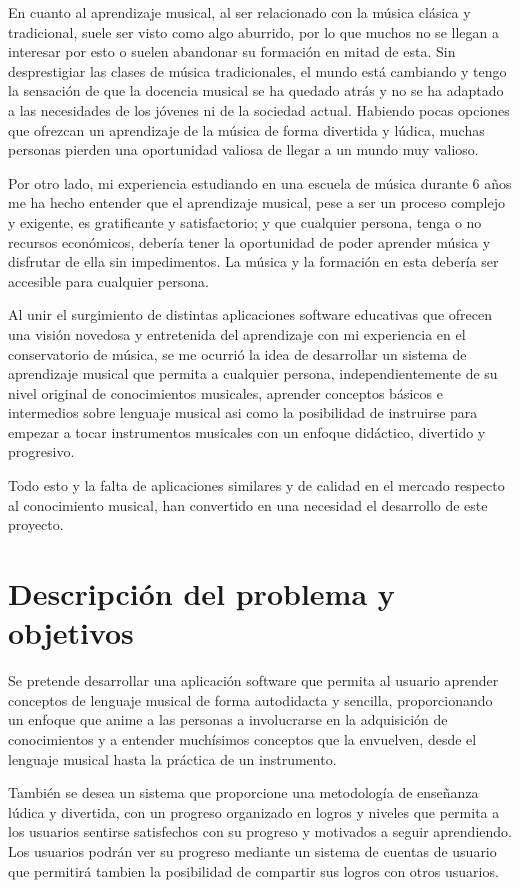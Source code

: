 En cuanto al aprendizaje musical, al ser relacionado con la música clásica y tradicional, suele ser visto como algo aburrido,
por lo que muchos no se llegan a interesar por esto o suelen abandonar su formación en mitad de esta.
Sin desprestigiar las clases de música tradicionales, el mundo está cambiando y tengo la sensación de que la docencia musical se ha quedado atrás y no se ha adaptado
a las necesidades de los jóvenes ni de la sociedad actual.
Habiendo pocas opciones que ofrezcan un aprendizaje de la música de forma divertida y lúdica, muchas personas pierden una oportunidad valiosa de llegar a un mundo muy valioso.

Por otro lado, mi experiencia estudiando en una escuela de música durante 6 años me ha hecho entender que el aprendizaje musical, pese a ser un proceso complejo y exigente,
es gratificante y satisfactorio; y que cualquier persona, tenga o no recursos económicos, debería tener la oportunidad de poder aprender música y disfrutar de ella sin impedimentos.
La música y la formación en esta debería ser accesible para cualquier persona.

Al unir el surgimiento de distintas aplicaciones software educativas que ofrecen una visión novedosa y entretenida del aprendizaje con mi experiencia en 
el conservatorio de música, se me ocurrió la idea de desarrollar un sistema de aprendizaje musical que permita a cualquier persona, independientemente
de su nivel original de conocimientos musicales, aprender conceptos básicos e intermedios sobre lenguaje musical asi como
la posibilidad de instruirse para empezar a tocar instrumentos musicales con un enfoque didáctico, divertido y progresivo.

Todo esto y la falta de aplicaciones similares y de calidad en el mercado respecto al conocimiento musical, han convertido en una necesidad el desarrollo de este proyecto.
\newpage
\section{Descripción del problema y objetivos}
Se pretende desarrollar una aplicación software que permita al usuario aprender conceptos de lenguaje musical de forma autodidacta y sencilla,
proporcionando un enfoque que anime a las personas a involucrarse en la adquisición de conocimientos y a entender muchísimos conceptos que la envuelven, desde el lenguaje musical
hasta la práctica de un instrumento. 

También se desea un sistema que proporcione una metodología de enseñanza lúdica y divertida, 
con un progreso organizado en logros y niveles que permita a los usuarios sentirse satisfechos con su progreso y motivados a seguir aprendiendo. 
Los usuarios podrán ver su progreso mediante un sistema de cuentas de usuario que permitirá tambien la posibilidad de compartir sus logros con otros usuarios.

